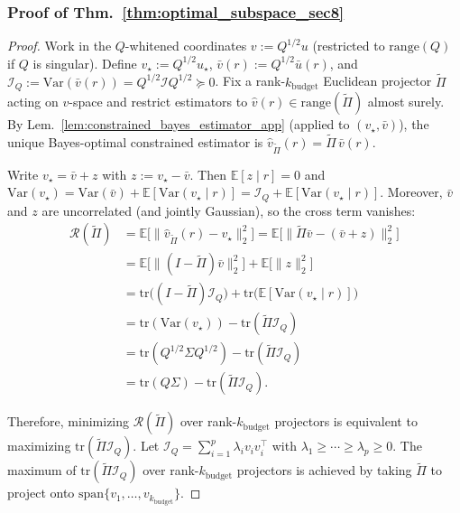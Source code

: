 \documentclass{article}
\theoremstyle{plain}
\theoremstyle{definition}
\theoremstyle{remark}
\begin{document}
\subsubsection{Proof of Thm.~\ref{thm:optimal_subspace_sec8}}
\label{app:proof_optimal_subspace}

\begin{proof}
Work in the $Q$-whitened coordinates $v:=Q^{1/2}u$ (restricted to $\mathrm{range}(Q)$ if $Q$ is singular). Define $v_\star:=Q^{1/2}u_\star$, $\bar v(r):=Q^{1/2}\bar u(r)$, and $\mathcal I_Q:=\mathrm{Var}(\bar v(r))=Q^{1/2}\mathcal I Q^{1/2}\succeq 0$.
Fix a rank-$k_{\text{budget}}$ Euclidean projector $\widetilde\Pi$ acting on $v$-space and restrict estimators to
$\widehat v(r)\in\mathrm{range}(\widetilde\Pi)$ almost surely. By Lem.~\ref{lem:constrained_bayes_estimator_app} (applied to $(v_\star,\bar v)$),
the unique Bayes-optimal constrained estimator is $\widehat v_{\widetilde\Pi}(r)=\widetilde\Pi\,\bar v(r)$.

Write $v_\star=\bar v+z$ with $z:=v_\star-\bar v$. Then $\mathbb E[z\mid r]=0$ and
$\mathrm{Var}(v_\star)=\mathrm{Var}(\bar v)+\mathbb E[\mathrm{Var}(v_\star\mid r)]
=\mathcal I_Q+\mathbb E[\mathrm{Var}(v_\star\mid r)]$.
Moreover, $\bar v$ and $z$ are uncorrelated (and jointly Gaussian), so the cross term vanishes:
\begin{align*}
\mathcal R(\widetilde\Pi)
&=\mathbb E\bigl[\|\widehat v_{\widetilde\Pi}(r)-v_\star\|_2^2\bigr]
=\mathbb E\bigl[\|\widetilde\Pi\bar v-(\bar v+z)\|_2^2\bigr]\\
&=\mathbb E\bigl[\|(I-\widetilde\Pi)\bar v\|_2^2\bigr]+\mathbb E\bigl[\|z\|_2^2\bigr]\\
&=\mathrm{tr}\!\bigl((I-\widetilde\Pi)\mathcal I_Q\bigr)+\mathrm{tr}\!\bigl(\mathbb E[\mathrm{Var}(v_\star\mid r)]\bigr)\\
&=\mathrm{tr}(\mathrm{Var}(v_\star))-\mathrm{tr}(\widetilde\Pi\mathcal I_Q)\\
&=\mathrm{tr}(Q^{1/2}\Sigma Q^{1/2})-\mathrm{tr}(\widetilde\Pi\mathcal I_Q) \\
&=\mathrm{tr}(Q\Sigma)-\mathrm{tr}(\widetilde\Pi\mathcal I_Q).
\end{align*}

Therefore, minimizing $\mathcal R(\widetilde\Pi)$ over rank-$k_{\text{budget}}$ projectors is equivalent to maximizing
$\mathrm{tr}(\widetilde\Pi\mathcal I_Q)$. Let $\mathcal I_Q=\sum_{i=1}^p \lambda_i v_i v_i^\top$ with
$\lambda_1\ge\cdots\ge\lambda_p\ge 0$. The maximum of $\mathrm{tr}(\widetilde\Pi\mathcal I_Q)$ over rank-$k_{\text{budget}}$
projectors is achieved by taking $\widetilde\Pi$ to project onto $\mathrm{span}\{v_1,\dots,v_{k_{\text{budget}}}\}$.
\end{proof}
\end{document}
